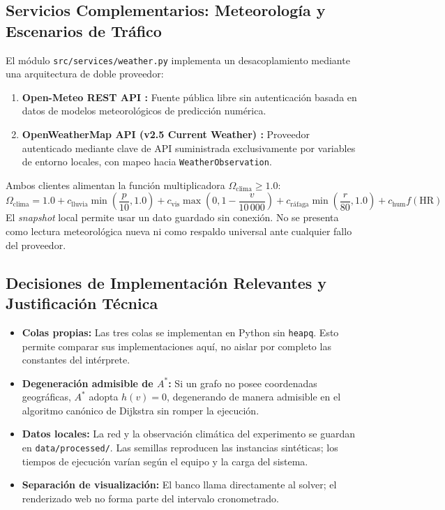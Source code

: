 \subsection{Servicios Complementarios: Meteorología y Escenarios de Tráfico}
\label{sec:servicio_meteorologico}
El módulo \texttt{src/services/weather.py} implementa un desacoplamiento mediante una arquitectura de doble proveedor:
\begin{enumerate}
    \item \textbf{Open-Meteo REST API \parencite{openmeteo2026}:} Fuente pública libre sin autenticación basada en datos de modelos meteorológicos de predicción numérica.
    \item \textbf{OpenWeatherMap API (v2.5 Current Weather) \parencite{openweathermap2026}:} Proveedor autenticado mediante clave de API suministrada exclusivamente por variables de entorno locales, con mapeo hacia \texttt{WeatherObservation}.
\end{enumerate}
Ambos clientes alimentan la función multiplicadora $\Omega_{\text{clima}} \ge 1.0$:
\begin{equation}
    \Omega_{\text{clima}} = 1.0 + c_{\text{lluvia}} \min\left(\frac{p}{10}, 1.0\right) + c_{\text{vis}} \max\left(0, 1 - \frac{v}{10\,000}\right) + c_{\text{ráfaga}} \min\left(\frac{r}{80}, 1.0\right) + c_{\text{hum}} f(\text{HR})
\end{equation}
El \textit{snapshot} local permite usar un dato guardado sin conexión. No se presenta como lectura meteorológica nueva ni como respaldo universal ante cualquier fallo del proveedor.

\subsection{Decisiones de Implementación Relevantes y Justificación Técnica}
\begin{itemize}
    \item \textbf{Colas propias:} Las tres colas se implementan en Python sin \texttt{heapq}. Esto permite comparar sus implementaciones aquí, no aislar por completo las constantes del intérprete.
    \item \textbf{Degeneración admisible de $A^*$:} Si un grafo no posee coordenadas geográficas, $A^*$ adopta $h(v)=0$, degenerando de manera admisible en el algoritmo canónico de Dijkstra sin romper la ejecución.
    \item \textbf{Datos locales:} La red y la observación climática del experimento se guardan en \texttt{data/processed/}. Las semillas reproducen las instancias sintéticas; los tiempos de ejecución varían según el equipo y la carga del sistema.
    \item \textbf{Separación de visualización:} El banco llama directamente al solver; el renderizado web no forma parte del intervalo cronometrado.
\end{itemize}
